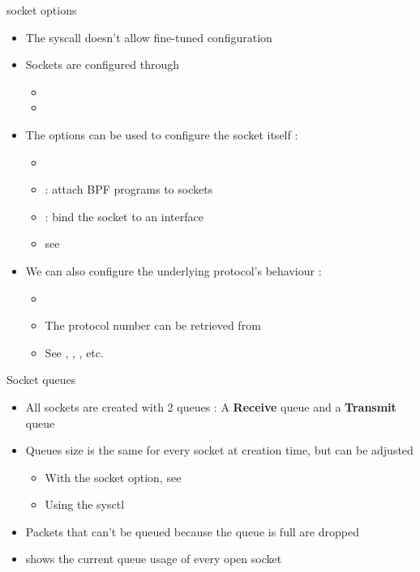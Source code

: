\begin{frame}{socket options}
	\begin{itemize}
		\item The  syscall doesn't allow fine-tuned configuration
		\item Sockets are configured through 
			\begin{itemize}
				\item {}
				\item {}
			\end{itemize}
		\item The options can be used to configure the socket itself :
			\begin{itemize}
				\item {}
				\item {} : attach BPF programs to sockets
				\item {} : bind the socket to an interface
				\item see 
			\end{itemize}
		\item We can also configure the underlying protocol's behaviour :
			\begin{itemize}
				\item {}
				\item The protocol number can be retrieved from 
				\item See , , , etc.
			\end{itemize}
	\end{itemize}
\end{frame}

\begin{frame}{Socket queues}
	\begin{itemize}
		\item All sockets are created with 2 queues : A \textbf{Receive} queue and a \textbf{Transmit} queue
		\item Queues size is the same for every socket at creation time, but can be adjusted
			\begin{itemize}
				\item With the  socket option, see 
				\item Using the  sysctl
			\end{itemize}
		\item Packets that can't be queued because the queue is full are dropped
		\item {} shows the current queue usage of every open socket
	\end{itemize}
\end{frame}

